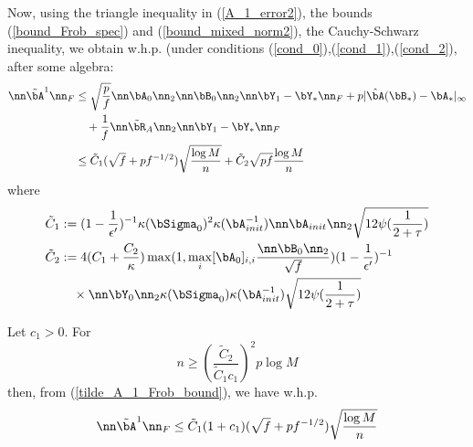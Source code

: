 \begin{IEEEproof}
Now, using the triangle inequality in (\ref{A_1_error2}), the bounds (\ref{bound_Frob_spec}) and (\ref{bound_mixed_norm2}), the Cauchy-Schwarz inequality, we obtain w.h.p. (under conditions (\ref{cond_0}),(\ref{cond_1}),(\ref{cond_2}), after some algebra:
\begin{align}
	\nn \tilde{\bA}^1 \nn_F &\leq \sqrt{\frac{p}{f}} \nn \bA_0\nn_2 \nn \bB_0\nn_2 \nn \bY_1-\bY_* \nn_F + p |\hat{\bA}(\bB_*)-\bA_*|_\infty \nonumber \\
		&\quad + \frac{1}{f} \nn\tilde{\bR}_A\nn_2 \nn \bY_1-\bY_* \nn_F  \nonumber \\
		&\leq \tilde{C}_1 (\sqrt{f}+pf^{-1/2}) \sqrt{\frac{\log M}{n}} + \tilde{C}_2 \sqrt{pf} \frac{\log M}{n} \label{tilde_A_1_Frob_bound}
\end{align}
where
\begin{align*}
	\tilde{C}_1 &:= (1-\frac{1}{\epsilon'})^{-1} \kappa(\bSigma_0)^2 \kappa(\bA_{init}^{-1}) \nn \bA_{init}\nn_2 \sqrt{12 \psi(\frac{1}{2+\tau})} \\
	\tilde{C}_2 &:= 4 (C_1+\frac{C_2}{\kappa}) \max(1,\max_i [\bA_0]_{i,i} \frac{\nn\bB_0\nn_2}{\sqrt{f}}) (1-\frac{1}{\epsilon'})^{-1} \\
	&\quad \times \nn\bY_0\nn_2 \kappa(\bSigma_0) \kappa(\bA_{init}^{-1}) \sqrt{12 \psi(\frac{1}{2+\tau})}
\end{align*}

Let $c_1>0$. For
\begin{equation} \label{cond_3}
	n \geq (\frac{\tilde{C}_2}{\tilde{C}_1 c_1})^2 p \log M
\end{equation}
then, from (\ref{tilde_A_1_Frob_bound}), we have w.h.p.
\begin{equation} \label{tilde_A_1_Frob2}
	\nn \tilde{\bA}^1 \nn_F \leq \tilde{C}_1 (1+c_1) (\sqrt{f}+pf^{-1/2}) \sqrt{\frac{\log M}{n}}
\end{equation}


\end{IEEEproof}

